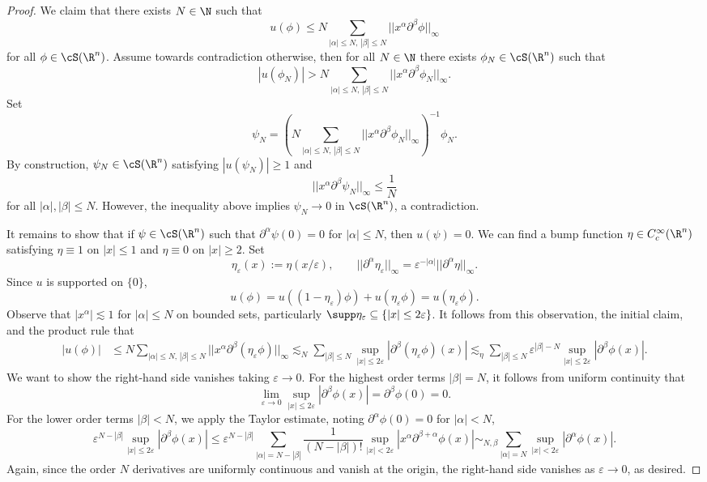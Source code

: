 \documentclass[reqno]{amsart}
\theoremstyle{definition}
\theoremstyle{remark}
\renewcommand{\epsilon}{\varepsilon}
\begin{document}
\begin{proof}
	We claim that there exists $N \in \N$ such that 
		\[ u(\phi) \leq N \sum_{|\alpha| \leq N, \, |\beta| \leq N} || x^\alpha \partial^\beta \phi ||_\infty \]
	for all $\phi \in \cS (\R^n)$. Assume towards contradiction otherwise, then for all $N \in \N$ there exists $\phi_N \in \cS(\R^n)$ such that
		\[ |u(\phi_N)| > N \sum_{|\alpha| \leq N, \, |\beta| \leq N} || x^\alpha \partial^\beta \phi_N ||_\infty. \]
	Set 
		\[ \psi_N = \left(N \sum_{|\alpha| \leq N, \, |\beta| \leq N} || x^\alpha \partial^\beta \phi_N ||_\infty\right)^{-1} \phi_N. \]	
	By construction, $\psi_N \in \cS(\R^n)$ satisfying $|u(\psi_N)| \geq 1$ and 
		\[ ||x^\alpha \partial^\beta \psi_N||_{\infty} \leq \frac1N\]
	for all $|\alpha|, |\beta| \leq N$. However, the inequality above implies $\psi_N \to 0$ in $\cS(\R^n)$, a contradiction. 
	
	It remains to show that if $\psi \in \cS(\R^n)$ such that $\partial^\alpha \psi(0) = 0$ for $|\alpha| \leq N$, then $u(\psi) = 0$. We can find a bump function $\eta \in C_c^\infty (\R^n)$ satisfying $\eta \equiv 1$ on $|x| \leq 1$ and $\eta \equiv 0$ on $|x| \geq 2$. Set 
		\[ \eta_\epsilon (x) := \eta(x/\epsilon), \qquad || \partial^\alpha \eta_\epsilon ||_\infty = \epsilon^{-|\alpha|} ||\partial^\alpha \eta ||_\infty.  \]
	Since $u$ is supported on $\{0\}$, 
		\[ u(\phi) = u((1 - \eta_\epsilon) \phi) + u(\eta_\epsilon \phi) = u(\eta_\epsilon \phi). \]
	Observe that $|x^\alpha| \lesssim 1$ for $|\alpha| \leq N$ on bounded sets, particularly $\supp \eta_\epsilon \subseteq \{ |x| \leq 2\epsilon \}$. It follows from this observation, the initial claim, and the product rule that 
		\begin{align*}
			|u(\phi)| 
				&\leq N \sum_{|\alpha| \leq N,\, |\beta| \leq N} ||x^\alpha \partial^{\beta} (\eta_\epsilon \phi) ||_\infty \lesssim_N \sum_{|\beta| \leq N} \sup_{|x|\leq 2 \epsilon}|\partial^\beta (\eta_\epsilon \phi) (x) |\lesssim_\eta \sum_{|\beta| \leq N} \epsilon^{|\beta| - N} \sup_{|x| \leq 2\epsilon}|\partial^\beta \phi (x)|.
		\end{align*}	
	We want to show the right-hand side vanishes taking $\epsilon \to 0$. For the highest order terms $|\beta| = N$, it follows from uniform continuity that 
		\[ \lim_{\epsilon \to 0} \sup_{|x| \leq 2\epsilon} |\partial^\beta \phi (x)| = \partial^\beta \phi (0) = 0.  \]
	For the lower order terms $|\beta| < N$, we apply the Taylor estimate, noting $\partial^\alpha \phi (0) = 0$ for $|\alpha| < N$, 
		\[ \epsilon^{N - |\beta|} \sup_{|x| \leq 2\epsilon}|\partial^\beta \phi (x)| \leq \epsilon^{N - |\beta|} \sum_{|\alpha| = N - |\beta|} \frac{1}{(N - |\beta|)!} \sup_{|x| < 2\epsilon} |x^\alpha \partial^{\beta + \alpha} \phi (x)| \sim_{N, \beta}  \sum_{|\alpha| = N} \sup_{|x| < 2\epsilon} | \partial^\alpha \phi (x)|. \]
	Again, since the order $N$ derivatives are uniformly continuous and vanish at the origin, the right-hand side vanishes as $\epsilon \to 0$, as desired. 		
	

\end{proof}
\end{document}
